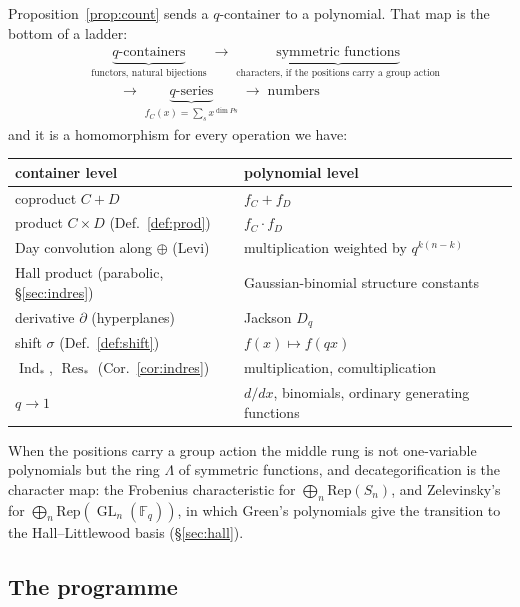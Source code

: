 \documentclass[11pt,a4paper]{article}
\theoremstyle{definition}
\theoremstyle{remark}
\newcommand{\FF}{\mathbb{F}}
\newcommand{\Rep}{\mathrm{Rep}}
\DeclareMathOperator{\GL}{GL}
\DeclareMathOperator{\Ind}{Ind}
\DeclareMathOperator{\Res}{Res}
\begin{document}
Proposition~\ref{prop:count} sends a $q$-container to a polynomial. That map is the
bottom of a ladder:
\begin{align*}
  &\underbrace{\text{$q$-containers}}_{\text{functors, natural bijections}}
  \;\longrightarrow\;
  \underbrace{\text{symmetric functions}}_{\text{characters, if the positions carry a group action}} \\[0.4em]
  &\qquad\longrightarrow\;
  \underbrace{\text{$q$-series}}_{f_C(x) = \sum_s x^{\dim P s}}
  \;\longrightarrow\;
  \text{numbers}
\end{align*}
and it is a homomorphism for every operation we have:

\begin{center}
\small
\setlength{\tabcolsep}{5pt}
\begin{tabular}{@{}>{\raggedright\arraybackslash}p{}>{\raggedright\arraybackslash}p{}@{}}
\toprule
container level & polynomial level \\
\midrule
coproduct $C + D$ & $f_C + f_D$ \\
product $C \times D$ (Def.~\ref{def:prod}) & $f_C \cdot f_D$ \\
Day convolution along $\oplus$ (Levi) & multiplication weighted by $q^{k(n-k)}$ \\
Hall product (parabolic, \S\ref{sec:indres}) & Gaussian-binomial structure constants \\
derivative $\partial$ (hyperplanes) & Jackson $D_q$ \\
shift $\sigma$ (Def.~\ref{def:shift}) & $f(x) \mapsto f(qx)$ \\
$\Ind_{*}$, $\Res_{*}$ (Cor.~\ref{cor:indres}) & multiplication, comultiplication \\
$q \to 1$ & $d/dx$, binomials, ordinary generating functions \\
\bottomrule
\end{tabular}
\end{center}

When the positions carry a group action the middle rung is not one-variable
polynomials but the ring $\Lambda$ of symmetric functions, and decategorification is
the character map: the Frobenius characteristic for $\bigoplus_n \Rep(S_n)$, and
Zelevinsky's for $\bigoplus_n \Rep(\GL_n(\FF_q))$, in which Green's polynomials give
the transition to the Hall--Littlewood basis (\S\ref{sec:hall}).

\subsection{The programme}
\end{document}
